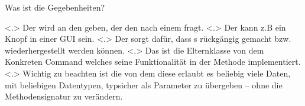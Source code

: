 \begin{frame}{Was ist die Gegebenheiten?}
\begin{itemize}[<+- | alert@+>]
            \note[item]<.>{
              Der  wird an den  geben, der den  nach einem  fragt.
            }
            \note[item]<.>{
              Der  kann z.B ein Knopf in einer GUI sein.
            }
            \note[item]<.>{
              Der  sorgt dafür, dass s rückgängig gemacht bzw. wiederhergestellt werden können.
            }
            \note[item]<.>{
              Das  ist die Elternklasse von dem Konkreten Command welches seine Funktionalität in der  Methode implementiert.
            }
            \note[item]<.>{
              Wichtig zu beachten ist die  von dem  diese erlaubt es beliebig viele Daten, mit beliebigen Datentypen, typsicher als Parameter zu übergeben -- ohne die Methodensignatur zu verändern.
            }
    \end{itemize}
  \end{frame}

